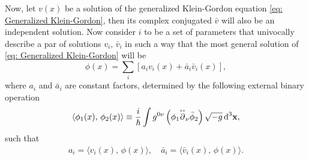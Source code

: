 Now, let $v(x)$ be a solution of the generalized Klein-Gordon equation \ref{eq: Generalized Klein-Gordon}, then its complex conjugated $\bar{v}$ will also be an independent solution. Now consider $i$ to be a set of parameters that univocally describe a par of solutions $v_i,\,\bar v_i$ in such a way that the most general solution of \ref{eq: Generalized Klein-Gordon} will be
\begin{equation}
	\phi(x)=\sum_ i\left[a_iv_i(x)+\bar a_i\bar v_i(x)\right],
\end{equation}
where $a_i$ and $\bar a_i$ are constant factors, determined by the following external binary operation
\begin{equation}\label{eq: General Scalar Inner Product}
	\langle \phi_1(x),\,\phi_2(x)\rangle\equiv \frac{i}{\hbar}\int g^{0\nu}\left(\phi_1\overset{\text{\tiny$\leftrightarrow$}}{\partial}_\nu\bar \phi_2\right)\sqrt{-g}\,\text{d}^3\mathbf{x},
\end{equation}
such that
\begin{subequations}
	\begin{gather}
		a_i = \langle v_i(x),\,\phi(x)\rangle,\quad \bar a_i = \langle \bar v_i(x),\,\phi(x)\rangle.\tag{\theequation \,\,a,b}
	\end{gather}
\end{subequations}


